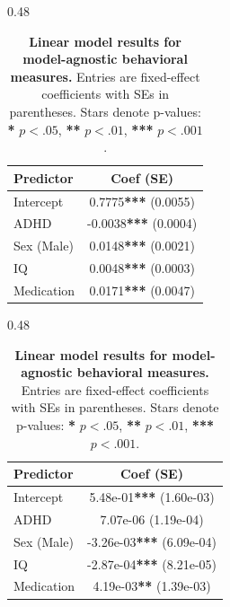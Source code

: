 \begin{table}[H]
\begin{minipage}{\linewidth}
    \begin{subtable}[t]{0.48\linewidth}
    \centering
    \caption{Go success rates}
    \begin{tabular}{lc}
    \toprule
    \textbf{Predictor} & \textbf{Coef (SE)} \\
    \midrule
    Intercept & 0.7775\textbf{***} (0.0055) \\
    ADHD & -0.0038\textbf{***} (0.0004) \\
    Sex (Male) & 0.0148\textbf{***} (0.0021) \\
    IQ & 0.0048\textbf{***} (0.0003) \\
    Medication & 0.0171\textbf{***} (0.0047) \\
    \bottomrule
    \end{tabular}
    \end{subtable}
\hfill
    \begin{subtable}[t]{0.48\linewidth}
    \centering
    \caption{Stop success rates}
    \begin{tabular}{lc}
    \toprule
    \textbf{Predictor} & \textbf{Coef (SE)} \\
    \midrule
    Intercept & 5.48e-01\textbf{***} (1.60e-03) \\
    ADHD & 7.07e-06 (1.19e-04) \\
    Sex (Male) & -3.26e-03\textbf{***} (6.09e-04) \\
    IQ & -2.87e-04\textbf{***} (8.21e-05) \\
    Medication & 4.19e-03\textbf{**} (1.39e-03) \\
    \bottomrule
    \end{tabular}
    \end{subtable}
\end{minipage}
\vspace{2mm}
\raggedright
\small
\caption{\textbf{Linear model results for model-agnostic behavioral measures.} Entries are fixed-effect coefficients with SEs in parentheses. Stars denote p-values: \textbf{*} $p<.05$, \textbf{**} $p<.01$, \textbf{***} $p<.001$.}
\label{tab:lm_beha_all}
\end{table}